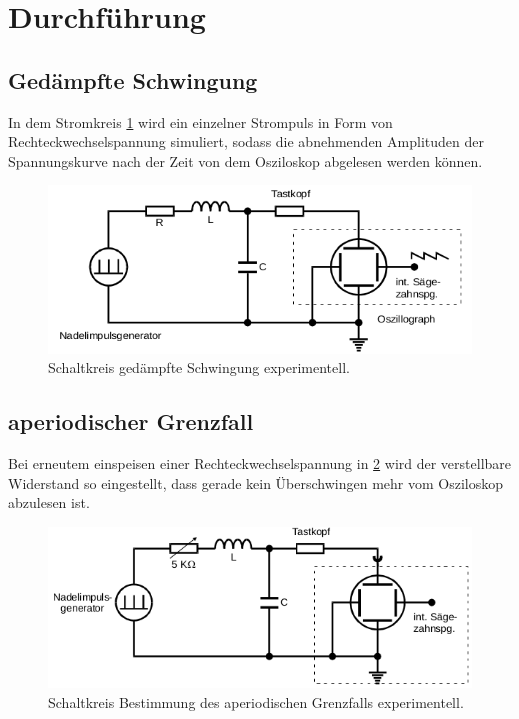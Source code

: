 \section{Durchführung}
\subsection{Gedämpfte Schwingung}
In dem Stromkreis \ref{fig:d1} wird ein einzelner Strompuls in Form
von Rechteckwechselspannung simuliert, sodass die
abnehmenden Amplituden der Spannungskurve nach der Zeit von dem Osziloskop abgelesen werden können.
\label{sec:Durchführung}
\begin{figure}[H]
  \centering
  \includegraphics{content/images/d1.png}
  \caption{Schaltkreis gedämpfte Schwingung experimentell.}
  \label{fig:d1}
\end{figure}

\subsection{aperiodischer Grenzfall}
Bei erneutem einspeisen einer Rechteckwechselspannung in \ref{fig:d2} wird der verstellbare
Widerstand so eingestellt, dass gerade kein Überschwingen mehr
vom Osziloskop abzulesen ist.
\begin{figure}[H]
  \centering
  \includegraphics{content/images/d2.png}
  \caption{Schaltkreis Bestimmung des aperiodischen Grenzfalls experimentell.}
  \label{fig:d2}
\end{figure}

